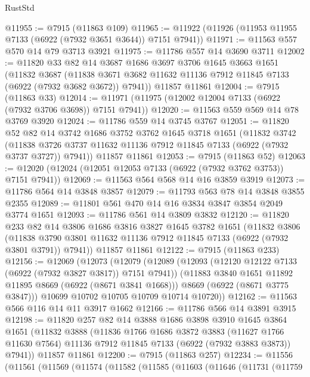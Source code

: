 \begin{lexlean}{RustStd}
\begin{coremodule}
@11955 := @7915 (@11863 @109)
@11965 := @11922 (@11926 (@11953 @11955 @7133 (@6922 (@7932 @3651 @3644)) @7151 @7941))
@11971 := @11563 @557 @570 @14 @79 @3713 @3921
@11975 := @11786 @557 @14 @3690 @3711
@12002 := @11820
    @33
    @82
    @14
    @3687
    @1686
    @3697
    @3706
    @1645
    @3663
    @1651
    (@11832
      @3687
      (@11838 @3671 @3682 @11632 @11136 @7912 @11845 @7133 (@6922 (@7932 @3682 @3672)) @7941))
    @11857
    @11861
@12004 := @7915 (@11863 @33)
@12014 := @11971 (@11975 (@12002 @12004 @7133 (@6922 (@7932 @3706 @3698)) @7151 @7941))
@12020 := @11563 @559 @569 @14 @78 @3769 @3920
@12024 := @11786 @559 @14 @3745 @3767
@12051 := @11820
    @52
    @82
    @14
    @3742
    @1686
    @3752
    @3762
    @1645
    @3718
    @1651
    (@11832
      @3742
      (@11838 @3726 @3737 @11632 @11136 @7912 @11845 @7133 (@6922 (@7932 @3737 @3727)) @7941))
    @11857
    @11861
@12053 := @7915 (@11863 @52)
@12063 := @12020 (@12024 (@12051 @12053 @7133 (@6922 (@7932 @3762 @3753)) @7151 @7941))
@12069 := @11563 @564 @568 @14 @16 @3859 @3919
@12073 := @11786 @564 @14 @3848 @3857
@12079 := @11793 @563 @78 @14 @3848 @3855 @2355
@12089 := @11801 @561 @470 @14 @16 @3834 @3847 @3854 @2049 @3774 @1651
@12093 := @11786 @561 @14 @3809 @3832
@12120 := @11820
    @233
    @82
    @14
    @3806
    @1686
    @3816
    @3827
    @1645
    @3782
    @1651
    (@11832
      @3806
      (@11838 @3790 @3801 @11632 @11136 @7912 @11845 @7133 (@6922 (@7932 @3801 @3791)) @7941))
    @11857
    @11861
@12122 := @7915 (@11863 @233)
@12156 := @12069
    (@12073
      (@12079
        (@12089
          (@12093 (@12120 @12122 @7133 (@6922 (@7932 @3827 @3817)) @7151 @7941))
          (@11883 @3840 @1651 @11892 @11895 @8669 (@6922 (@8671 @3841 @1668)))
          @8669
          (@6922 (@8671 @3775 @3847)))
        @10699
        @10702
        @10705
        @10709
        @10714
        @10720))
@12162 := @11563 @566 @116 @14 @11 @3917 @1662
@12166 := @11786 @566 @14 @3891 @3915
@12198 := @11820
    @257
    @82
    @14
    @3888
    @1686
    @3898
    @3910
    @1645
    @3864
    @1651
    (@11832
      @3888
      (@11836
        @1766
        @1686
        @3872
        @3883
        (@11627 @1766 @11630 @7564)
        @11136
        @7912
        @11845
        @7133
        (@6922 (@7932 @3883 @3873))
        @7941))
    @11857
    @11861
@12200 := @7915 (@11863 @257)
@12234 := @11556
    (@11561
      (@11569
        (@11574
          (@11582
            (@11585
              (@11603
                (@11646
                  (@11731
                    (@11759

\end{coremodule}
\end{lexlean}
